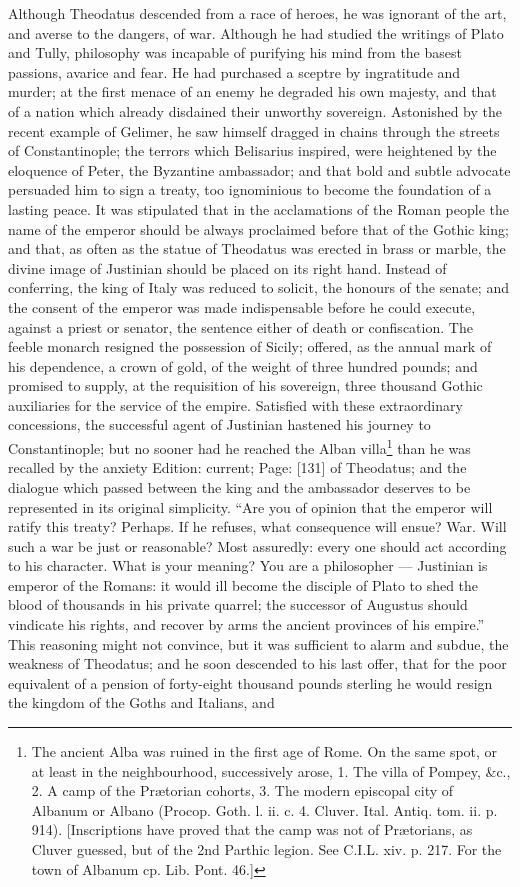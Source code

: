 Although Theodatus descended from a race of heroes, he was ignorant of the art, and averse to the dangers, of war. Although he had studied the writings of Plato and Tully, philosophy was incapable of purifying his mind from the basest passions, avarice and fear. He had purchased a sceptre by ingratitude and murder; at the first menace of an enemy he degraded his own majesty, and that of a nation which already disdained their unworthy sovereign. Astonished by the recent example of Gelimer, he saw himself dragged in chains through the streets of Constantinople; the terrors which Belisarius inspired, were heightened by the eloquence of Peter, the Byzantine ambassador; and that bold and subtle advocate persuaded him to sign a treaty, too ignominious to become the foundation of a lasting peace. It was stipulated that in the acclamations of the Roman people the name of the emperor should be always proclaimed before that of the Gothic king; and that, as often as the statue of Theodatus was erected in brass or marble, the divine image of Justinian should be placed on its right hand. Instead of conferring, the king of Italy was reduced to solicit, the honours of the senate; and the consent of the emperor was made indispensable before he could execute, against a priest or senator, the sentence either of death or confiscation. The feeble monarch resigned the possession of Sicily; offered, as the annual mark of his dependence, a crown of gold, of the weight of three hundred pounds; and promised to supply, at the requisition of his sovereign, three thousand Gothic auxiliaries for the service of the empire. Satisfied with these extraordinary concessions, the successful agent of Justinian hastened his journey to Constantinople; but no sooner had he reached the Alban villa\footnote{The ancient Alba was ruined in the first age of Rome. On the same spot, or at least in the neighbourhood, successively arose, 1. The villa of Pompey, \&c., 2. A camp of the Prætorian cohorts, 3. The modern episcopal city of Albanum or Albano (Procop. Goth. l. ii. c. 4. Cluver. Ital. Antiq. tom. ii. p. 914). [Inscriptions have proved that the camp was not of Prætorians, as Cluver guessed, but of the 2nd Parthic legion. See C.I.L. xiv. p. 217. For the town of Albanum cp. Lib. Pont. 46.]} than he was recalled by the anxiety Edition: current; Page: [131] of Theodatus; and the dialogue which passed between the king and the ambassador deserves to be represented in its original simplicity. \texthebrew{“}Are you of opinion that the emperor will ratify this treaty? Perhaps. If he refuses, what consequence will ensue? War. Will such a war be just or reasonable? Most assuredly: every one should act according to his character. What is your meaning? You are a philosopher \texthebrew{—} Justinian is emperor of the Romans: it would ill become the disciple of Plato to shed the blood of thousands in his private quarrel; the successor of Augustus should vindicate his rights, and recover by arms the ancient provinces of his empire.\texthebrew{}” This reasoning might not convince, but it was sufficient to alarm and subdue, the weakness of Theodatus; and he soon descended to his last offer, that for the poor equivalent of a pension of forty-eight thousand pounds sterling he would resign the kingdom of the Goths and Italians, and 